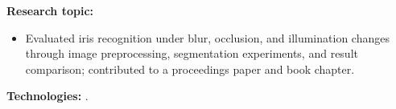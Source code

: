 \textbf{Research topic:} \ThesisTitle\par
\begin{itemize}
  \item Evaluated iris recognition under blur, occlusion, and illumination changes through image preprocessing, segmentation experiments, and result comparison; contributed to a proceedings paper and book chapter.
\end{itemize}
\textbf{Technologies:} \ResearchTools.\par
